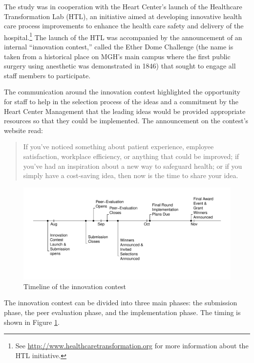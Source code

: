 \documentclass[11pt, titlepage]{article}
\begin{document}
The study was in cooperation with the Heart Center's launch of the
Healthcare Transformation Lab (HTL), an initiative aimed at developing
innovative health care process improvements to enhance the health care
safety and delivery of the hospital.\footnote{See
  \url{http://www.healthcaretransformation.org} for more information
  about the HTL initiative.} The launch of the HTL was accompanied by
the announcement of an internal ``innovation contest,'' called the Ether
Dome Challenge (the name is taken from a historical place on MGH's main
campus where the first public surgery using anesthetic was demonstrated
in 1846) that sought to engage all staff members to participate.

The communication around the innovation contest highlighted the
opportunity for staff to help in the selection process of the ideas and
a commitment by the Heart Center Management that the leading ideas would
be provided appropriate resources so that they could be implemented. The
announcement on the contest's website read:

\begin{quote}
If you've noticed something about patient experience, employee
satisfaction, workplace efficiency, or anything that could be improved;
if you've had an inspiration about a new way to safeguard health; or if
you simply have a cost-saving idea, then now is the time to share your
idea.
\end{quote}

\begin{figure}
\centering
\includegraphics{Figures/timeline-1.pdf}
\caption{Timeline of the innovation contest\label{fig: phase}}
\end{figure}

The innovation contest can be divided into three main phases: the
submission phase, the peer evaluation phase, and the implementation
phase. The timing is shown in Figure \ref{fig: phase}.
\end{document}
